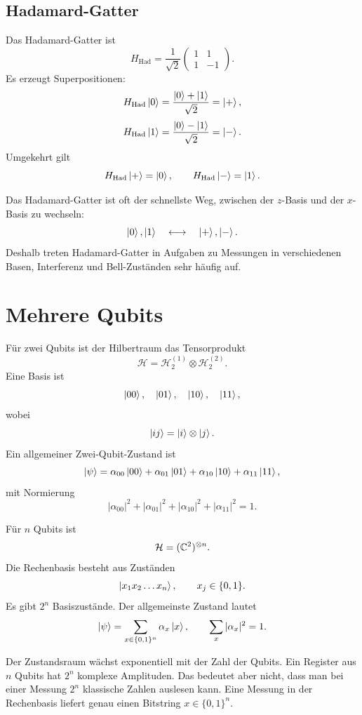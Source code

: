 \subsection{Hadamard-Gatter}

Das Hadamard-Gatter ist
\[
    H_{\mathrm{Had}}
    =\frac{1}{\sqrt2}
    \begin{pmatrix}
        1&1\\
        1&-1
    \end{pmatrix}.
\]
Es erzeugt Superpositionen:
\[
    H_{\mathrm{Had}}\left|0\right\rangle
    =\frac{\left|0\right\rangle+\left|1\right\rangle}{\sqrt2}
    =\left|+\right\rangle,
\]
\[
    H_{\mathrm{Had}}\left|1\right\rangle
    =\frac{\left|0\right\rangle-\left|1\right\rangle}{\sqrt2}
    =\left|-\right\rangle.
\]
Umgekehrt gilt
\[
    H_{\mathrm{Had}}\left|+\right\rangle=\left|0\right\rangle,
    \qquad
    H_{\mathrm{Had}}\left|-\right\rangle=\left|1\right\rangle.
\]

\begin{examtipbox}
Das Hadamard-Gatter ist oft der schnellste Weg, zwischen der \(z\)-Basis und der \(x\)-Basis zu wechseln:
\[
    \left|0\right\rangle,\left|1\right\rangle
    \quad\longleftrightarrow\quad
    \left|+\right\rangle,\left|-\right\rangle.
\]
Deshalb treten Hadamard-Gatter in Aufgaben zu Messungen in verschiedenen Basen, Interferenz und Bell-Zuständen sehr häufig auf.
\end{examtipbox}

\section{Mehrere Qubits}

Für zwei Qubits ist der Hilbertraum das Tensorprodukt
\[
    \mathcal H = \mathcal H_2^{(1)}\otimes \mathcal H_2^{(2)}.
\]
Eine Basis ist
\[
    \left|00\right\rangle,\quad \left|01\right\rangle,\quad \left|10\right\rangle,\quad \left|11\right\rangle,
\]
wobei
\[
    \left|ij\right\rangle=\left|i\right\rangle\otimes\left|j\right\rangle.
\]
Ein allgemeiner Zwei-Qubit-Zustand ist
\[
    \left|\psi\right\rangle
    =\alpha_{00}\left|00\right\rangle+\alpha_{01}\left|01\right\rangle
    +\alpha_{10}\left|10\right\rangle+\alpha_{11}\left|11\right\rangle,
\]
mit Normierung
\[
    |\alpha_{00}|^2+|\alpha_{01}|^2+|\alpha_{10}|^2+|\alpha_{11}|^2=1.
\]

Für \(n\) Qubits ist
\[
    \mathcal H=(\mathbb C^2)^{\otimes n}.
\]
Die Rechenbasis besteht aus Zuständen
\[
    \left|x_1x_2\dots x_n\right\rangle,
    \qquad
    x_j\in\{0,1\}.
\]
Es gibt \(2^n\) Basiszustände. Der allgemeinste Zustand lautet
\[
    \left|\psi\right\rangle=\sum_{x\in\{0,1\}^n}\alpha_x\left|x\right\rangle,
    \qquad
    \sum_x |\alpha_x|^2=1.
\]

\begin{notebox}
Der Zustandsraum wächst exponentiell mit der Zahl der Qubits. Ein Register aus \(n\) Qubits hat \(2^n\) komplexe Amplituden. Das bedeutet aber nicht, dass man bei einer Messung \(2^n\) klassische Zahlen auslesen kann. Eine Messung in der Rechenbasis liefert genau einen Bitstring \(x\in\{0,1\}^n\).
\end{notebox}

